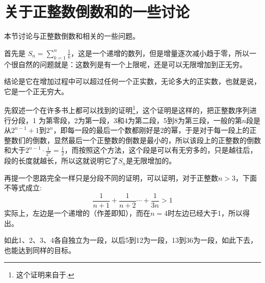 
\section{关于正整数倒数和的一些讨论}
\label{sec:sum-reciprocal-of-positive-integer}

本节讨论与正整数倒数和相关的一些问题。

首先是 $S_n=\sum_{k=1}^n\frac{1}{k}$，这是一个递增的数列，但是增量逐次减小趋于零，所以一个很自然的问题就是：这数列是有一个上限呢，还是可以无限增加到正无穷。

结论是它在增加过程中可以超过任何一个正实数，无论多大的正实数，也就是说，它是一个正无穷大。

先叙述一个在许多书上都可以找到的证明\footnote{这个证明来自于\cite{olympic-math}.}，这个证明是这样的，把正整数序列进行分段，1 为第零段，2为第一段，3和4为第二段，5到8为第三段，一般的第$n$段是从$2^{n-1}+1$到$2^n$，即每一段的最后一个数都刚好是2的幂，于是对于每一段上的正整数们的倒数，显然最后一个正整数的倒数是最小的，所以该段上的正整数的倒数和大于$2^{n-1}\cdot \frac{1}{2^n}=\frac{1}{2}$，而按照这个方法，这个段是可以有无穷多的，只是越往后，段的长度就越长，所以这就说明它了$S_n$是无限增加的。

再提一个思路完全一样只是分段不同的证明，可以证明，对于正整数$n>3$，下面不等式成立:
\begin{equation*}
  \frac{1}{n+1} + \frac{1}{n+2} \cdots + \frac{1}{3n} > 1
\end{equation*}
实际上，左边是一个递增的（作差即知），而在$n=4$时左边已经大于1，所以得出。

如此1、2、3、4各自独立为一段，以后5到12为一段，13到36为一段，如此下去，也能达到同样的目标。


